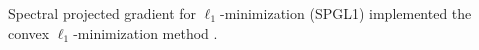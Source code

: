 Spectral projected gradient for
$\ell_{1}$-minimization (\acs{SPGL1})
\cite{article:VanDenBergSIAMJSC2009} implemented
the convex $\ell_{1}$-minimization method
.
